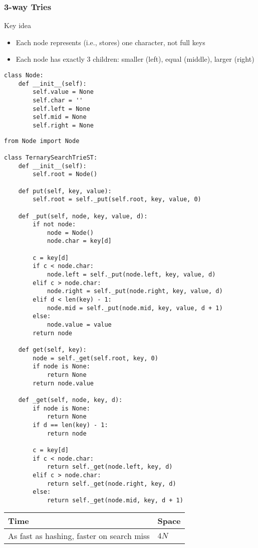 \documentclass[a4paper]{article}
\begin{document}
\subsubsection*{3-way Tries}
Key idea
\begin{itemize}
    \item Each node represents (i.e., stores) one character, not full keys
    \item Each node has exactly 3 children: smaller (left), equal (middle), larger (right)
\end{itemize}

\begin{lstlisting}
class Node:
    def __init__(self):
        self.value = None
        self.char = ''
        self.left = None
        self.mid = None
        self.right = None
\end{lstlisting}

\begin{lstlisting}
from Node import Node

class TernarySearchTrieST:
    def __init__(self):
        self.root = Node()

    def put(self, key, value):
        self.root = self._put(self.root, key, value, 0)

    def _put(self, node, key, value, d):
        if not node:
            node = Node()
            node.char = key[d]

        c = key[d]
        if c < node.char:
            node.left = self._put(node.left, key, value, d)
        elif c > node.char:
            node.right = self._put(node.right, key, value, d)
        elif d < len(key) - 1:
            node.mid = self._put(node.mid, key, value, d + 1)
        else:
            node.value = value
        return node

    def get(self, key):
        node = self._get(self.root, key, 0)
        if node is None:
            return None
        return node.value

    def _get(self, node, key, d):
        if node is None:
            return None
        if d == len(key) - 1:
            return node

        c = key[d]
        if c < node.char:
            return self._get(node.left, key, d)
        elif c > node.char:
            return self._get(node.right, key, d)
        else:
            return self._get(node.mid, key, d + 1)
\end{lstlisting}

\begin{spacing}{1.5}
\begin{tabularx}{1\textwidth}{|X|X|}
    \hline
    \textbf{Time}  & \textbf{Space}\\
    \hline
    As fast as hashing, faster on search miss&$4N$\\
    \hline
\end{tabularx}
\end{spacing}
\end{document}
